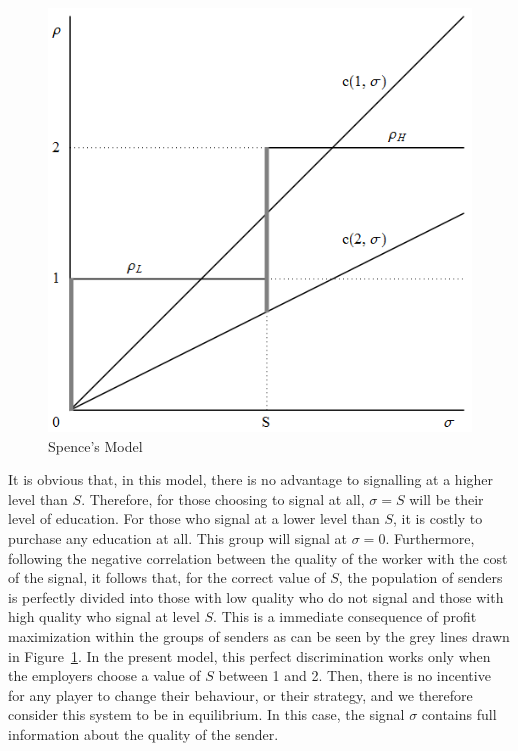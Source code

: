 \documentclass[a4paper,10pt]{article}
\numberwithin{equation}{section}
\begin{document}
\begin{figure}[h]
\begin{center}
\leavevmode
\includegraphics[scale=.4]{Graph1.png}
\end{center}
\caption{Spence's Model}
\label{fig:Graph1.png}
\end{figure}

It is obvious that, in this model, there is no advantage to signalling at a higher level than $S$. Therefore, for those choosing to signal at all, $\sigma=S$ will be their level of education. For those who signal at a lower level than $S$, it is costly to purchase any education at all. This group will signal at $\sigma=0$. Furthermore, following the negative correlation between the quality of the worker with the cost of the signal, it follows that, for the correct value of $S$, the population of senders is perfectly divided into those with low quality who do not signal and those with high quality who signal at level $S$. This is a immediate consequence of profit maximization within the groups of senders as can be seen by the grey lines drawn in Figure~\ref{fig:Graph1.png}. In the present model, this perfect discrimination works only when the employers choose a value of $S$ between 1 and 2. Then, there is no incentive for any player to change their behaviour, or their strategy, and we therefore consider this system to be in equilibrium. In this case, the signal $\sigma$ contains full information about the quality of the sender.
\end{document}
